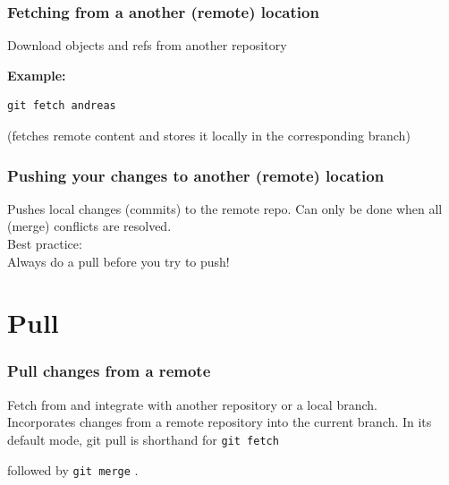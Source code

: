 \documentclass{gittalk}
\newcommand{\hlcommand}[1]{%
\colorbox{base3}{\small \texttt{#1}}
}
\begin{document}
\begin{frame}[fragile]
\frametitle{Fetching from a another (remote) location}
\begin{tcolorbox}[title=git fetch]
Download objects and refs from another repository
\end{tcolorbox}
\vspace*{1em}
\textbf{Example:}
\begin{lstlisting}
git fetch andreas
\end{lstlisting}
(fetches remote content and stores it locally in the corresponding branch)
\end{frame}

\begin{frame}
\frametitle{Pushing your changes to another (remote) location}
\begin{tcolorbox}[title=git push]
Pushes local changes (commits) to the remote repo. Can only be done when all
(merge) conflicts are resolved.\\[0.5em]
Best practice:\\
Always do a pull before you try to push!
\end{tcolorbox}
\end{frame}

\section{Pull}

\begin{frame}[fragile]
\frametitle{Pull changes from a remote}
\begin{tcolorbox}[title=git pull]
Fetch from and integrate with another repository or a local
branch.\\[0.5em]
Incorporates changes from a remote repository into the current branch.
In its default mode, git pull is shorthand for \hlcommand{git fetch}
followed by \hlcommand{git merge}.
\end{tcolorbox}
\end{frame}
\end{document}
